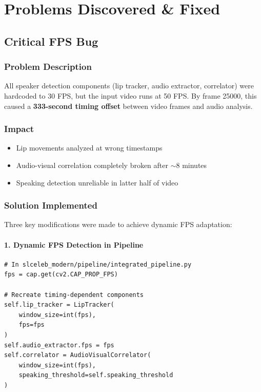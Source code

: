 \documentclass[11pt,a4paper]{article}
\begin{document}
\section{Problems Discovered \& Fixed}

\subsection{Critical FPS Bug}

\subsubsection{Problem Description}

All speaker detection components (lip tracker, audio extractor, correlator) were hardcoded to 30 FPS, but the input video runs at 50 FPS. By frame 25000, this caused a \textbf{333-second timing offset} between video frames and audio analysis.

\subsubsection{Impact}

\begin{itemize}
    \item Lip movements analyzed at wrong timestamps
    \item Audio-visual correlation completely broken after $\sim$8 minutes
    \item Speaking detection unreliable in latter half of video
\end{itemize}

\subsubsection{Solution Implemented}

Three key modifications were made to achieve dynamic FPS adaptation:

\paragraph{1. Dynamic FPS Detection in Pipeline}
\begin{lstlisting}[style=pythoncode]
# In slceleb_modern/pipeline/integrated_pipeline.py
fps = cap.get(cv2.CAP_PROP_FPS)

# Recreate timing-dependent components
self.lip_tracker = LipTracker(
    window_size=int(fps), 
    fps=fps
)
self.audio_extractor.fps = fps
self.correlator = AudioVisualCorrelator(
    window_size=int(fps),
    speaking_threshold=self.speaking_threshold
)
\end{lstlisting}
\end{document}
